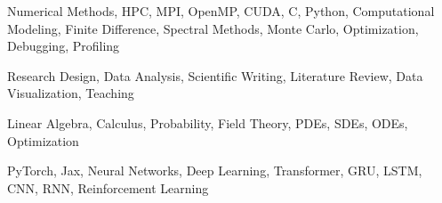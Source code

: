 

\begin{cventries}

  {
    \begin{cvitems}
    \item Numerical Methods, HPC, MPI, OpenMP, CUDA, C, Python, Computational Modeling, Finite Difference, Spectral Methods, Monte Carlo, Optimization, Debugging, Profiling
    \end{cvitems}
  }

  {
    \begin{cvitems}
    \item Research Design, Data Analysis, Scientific Writing, Literature Review, Data Visualization, Teaching
    \end{cvitems}
  }

  {
    \begin{cvitems}
    \item Linear Algebra, Calculus, Probability, Field Theory, PDEs, SDEs, ODEs, Optimization
    \end{cvitems}
  }

  {
    \begin{cvitems}
    \item PyTorch, Jax, Neural Networks, Deep Learning, Transformer, GRU, LSTM, CNN, RNN, Reinforcement Learning
    \end{cvitems}
  }

\end{cventries}
